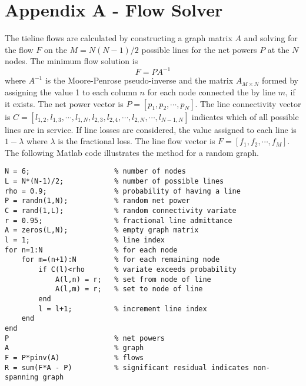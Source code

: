 \chapter*{Appendix A - Flow Solver}

The tieline flows are calculated by constructing a graph matrix $A$ and solving for the flow $F$ on the $M=N(N-1)/2$ possible lines for the net powers $P$ at the $N$ nodes.  The minimum flow solution is
\begin{equation}
	F = P A^{-1}
\end{equation}
where $A^{-1}$ is the Moore-Penrose pseudo-inverse and the matrix $A_{M\times N}$ formed by assigning the value 1 to each column $n$ for each node connected the by line $m$, if it exists. The net power vector is $P=[p_1,p_2,\cdots,p_N]$. The line connectivity vector is $C=[l_{1,2}, l_{1,3}, \cdots, l_{1,N}, l_{2,3}, l_{2,4}, \cdots, l_{2,N}, \cdots, l_{N-1,N}]$ indicates which of all possible lines are in service. If line losses are considered, the value assigned to each line is $1-\lambda$ where $\lambda$ is the fractional loss. 
The line flow vector is $F=[f_1,f_2,\cdots,f_M]$. The following Matlab code illustrates the method for a random graph.

\begin{framed}
\begin{verbatim}
N = 6;                    % number of nodes
L = N*(N-1)/2;            % number of possible lines
rho = 0.9;                % probability of having a line
P = randn(1,N);           % random net power
C = rand(1,L);            % random connectivity variate
r = 0.95;                 % fractional line admittance
A = zeros(L,N);           % empty graph matrix
l = 1;                    % line index
for n=1:N                 % for each node
    for m=(n+1):N         % for each remaining node
        if C(l)<rho       % variate exceeds probability
            A(l,n) = r;   % set from node of line
            A(l,m) = r;   % set to node of line
        end
        l = l+1;          % increment line index
    end
end
P                         % net powers
A                         % graph
F = P*pinv(A)             % flows
R = sum(F*A - P)          % significant residual indicates non-spanning graph
\end{verbatim}
\end{framed}

